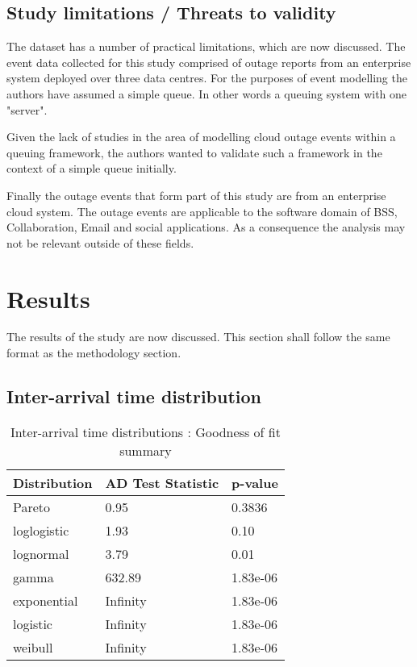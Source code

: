 \documentclass[5p]{elsarticle}
\begin{document}
\subsection{Study limitations / Threats to validity}

The dataset has a number of practical limitations, which are now discussed. The event data collected for this study comprised of outage reports from an enterprise system deployed over three data centres. For the purposes of event modelling the authors have assumed a simple queue. In other words a queuing system with one "server". 

Given the lack of studies in the area of modelling cloud outage events within a queuing framework, the authors wanted to validate such a framework in the context of a simple queue initially. 

Finally the outage events that form part of this study are from an enterprise cloud system. The outage events are applicable to the software domain of BSS, Collaboration, Email and social applications. As a consequence the analysis may not be relevant outside of these fields.

\section{Results}
The results of the study are now discussed. This section shall follow the same format as the methodology section.

\subsection{Inter-arrival time distribution}

\begin {table}
\caption {Inter-arrival time distributions :  Goodness of fit summary} 
\begin{center}
\begin{tabular}{p{2.1cm} |  p{3.1cm} | p{1.3cm}} \hline \bf{Distribution} & \bf{AD Test Statistic} & \bf{p-value}
\\ \hline Pareto & 0.95 & 0.3836 
\\ loglogistic & 1.93 & 0.10
\\ lognormal & 3.79 & 0.01
\\ gamma & 632.89 & 1.83e-06	
\\ exponential & Infinity  & 1.83e-06
\\ logistic & Infinity & 1.83e-06	
\\ weibull  & Infinity & 1.83e-06 
\\ \hline
\end{tabular}
\end{center}
\end{table}
\end{document}
